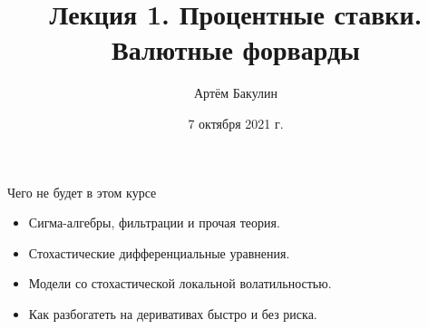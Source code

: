 \documentclass{beamer}
\title{Лекция 1. Процентные ставки. Валютные форварды}
\author{Артём Бакулин}
\date{7 октября 2021 г.}
\newcommand{\en}[1]{\begin{otherlanguage}{english}#1\end{otherlanguage}}
\newcommand{\ruen}[2]{#1 (\en{#2})}
\begin{document}
\begin{frame}
\titlepage
\end{frame}



\begin{frame}{Чего не будет в этом курсе}
\begin{itemize}
\justifying
\item Сигма-алгебры, фильтрации и прочая теория.
\item Стохастические дифференциальные уравнения.
\item Модели со стохастической локальной волатильностью.
\item Как разбогатеть на деривативах быстро и без риска.
\end{itemize}
\end{frame}



%




\end{document}
